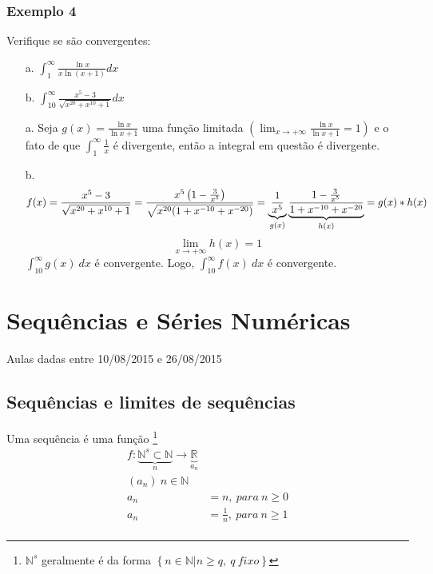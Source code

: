 \documentclass[12pt,openany, letterpaper]{book}
\begin{document}
\subsection{Exemplo 4}
\label{sub:ex144}

\hspace{5mm} Verifique se são convergentes:
\begin{enumerate}
\item [a.] $\displaystyle{\int_1^{\infty} \frac{\ln x}{x \ln \left(x+1\right)} dx}$
\item [b.] $\displaystyle{\int_{10}^{\infty}\frac{x^5-3}{\sqrt{x^{20}+x^{10}+1}} dx}$
\end{enumerate}

\begin{enumerate}
\item [a.] Seja  $\displaystyle{g(x) = \frac{\ln x}{\ln {x+1}}}$ uma função limitada $\displaystyle{\left(\lim_{x \rightarrow +\infty} \frac{\ln x}{\ln {x+1}} = 1\right)}$ e o fato de que $\displaystyle{\int_1^{\infty} \frac{1}{x}}$ é divergente, então a integral em questão é divergente.
\item [b.] $$f(x) = \frac{x^5-3}{\sqrt{x^{20}+x^{10}+1}} = \frac{x^5\left(1-\frac{3}{x^5}\right)}{\sqrt{x^{20}(1+x^{-10}+x^{-20})}}= \underbrace{1 \over x^5}_{g(x)} \underbrace{\frac{1-\frac{3}{x^5}}{1+x^{-10}+x^{-20}}}_{h(x)} = g(x)*h(x)$$ 
$$\lim_{x \rightarrow +\infty} h(x) = 1$$ 
$\displaystyle{\int_{10}^{\infty} g(x)\ dx}$ é convergente. Logo, $\displaystyle{\int_{10}^{\infty} f(x)\ dx}$ é convergente.
\end{enumerate}

\chapter{Sequências e Séries Numéricas} Aulas dadas entre 10/08/2015 e 26/08/2015
\label{chap:c2}

\section{Sequências e limites de sequências}
\label{sec:s21}

\hspace{5mm} Uma sequência  é uma função \footnote{$\mathds{N}^s$ geralmente é da forma $\left\{ n \in \mathds{N} | n \geq q , \ q \ fixo \right\} $ } \begin{align*}
f: \underbrace{\mathds{N}^s \subset \mathds{N}}_n \rightarrow \underbrace{\mathds{R}}_{a_n} \\
(a_n) \ n \in \mathds{N} \\
a_n &= n,\ para \ n \geq 0 \\
a_n &= \frac{1}{n} ,\ para \ n \geq 1 \\
\end{align*}
\end{document}
